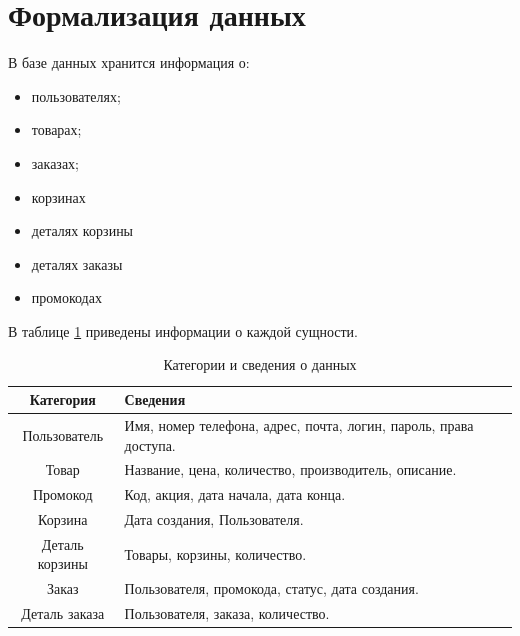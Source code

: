 \newpage
\section{Формализация данных}

В базе данных хранится информация о:
\begin{itemize}[label=---]
	\item пользователях;
	\item товарах;
	\item заказах;
	\item корзинах
	\item деталях корзины
	\item деталях заказы
	\item промокодах
\end{itemize}

В таблице \ref{table:anal1} приведены информации о каждой сущности.
\begin{table}[ht!]
	\caption{Категории и сведения о данных}
	\label{table:anal1}
	\begin{center}
		\begin{tabular}{|c|p{9cm}|}
			\hline
			\textbf{Категория} & \textbf{Сведения}\\
			\hline
			Пользователь & Имя, номер телефона, адрес, почта, логин, пароль, права доступа.\\
			\hline
			Товар & Название, цена, количество, производитель, описание.\\
			\hline
			Промокод & Код, акция, дата начала, дата конца.\\
			\hline
			Корзина & Дата создания, Пользователя.\\
			\hline
			Деталь корзины & Товары, корзины, количество.\\
			\hline
			Заказ & Пользователя, промокода, статус, дата создания. \\ 
			\hline
			Деталь заказа & Пользователя, заказа, количество.\\
			\hline
		\end{tabular}
	\end{center}
\end{table}

\newpage

